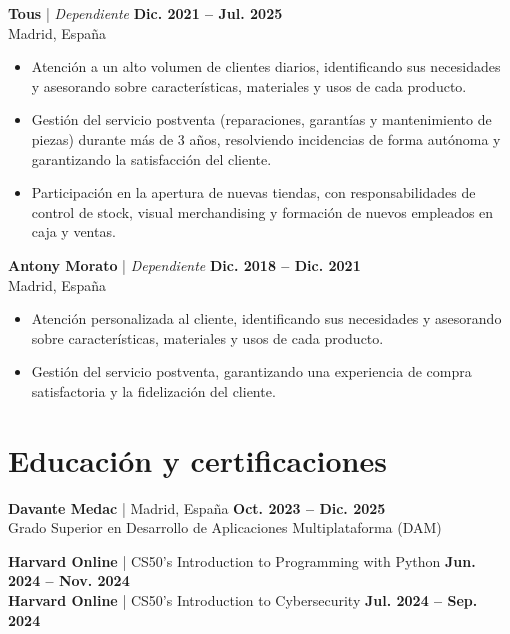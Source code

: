 \documentclass[10pt,a4paper]{article}
\begin{document}
\textbf{Tous} | \textit{Dependiente} \hfill \textbf{Dic. 2021 -- Jul. 2025} \\
Madrid, España
\begin{itemize}
    \item Atención a un alto volumen de clientes diarios, identificando sus necesidades y asesorando sobre características, materiales y usos de cada producto.
    \item Gestión del servicio postventa (reparaciones, garantías y mantenimiento de piezas) durante más de 3 años, resolviendo incidencias de forma autónoma y garantizando la satisfacción del cliente.
    \item Participación en la apertura de nuevas tiendas, con responsabilidades de control de stock, visual merchandising y formación de nuevos empleados en caja y ventas.
\end{itemize}

\vspace{6pt}

\textbf{Antony Morato} | \textit{Dependiente} \hfill \textbf{Dic. 2018 -- Dic. 2021} \\
Madrid, España
\begin{itemize}
    \item Atención personalizada al cliente, identificando sus necesidades y asesorando sobre características, materiales y usos de cada producto.
    \item Gestión del servicio postventa, garantizando una experiencia de compra satisfactoria y la fidelización del cliente.
\end{itemize}

\section{Educación y certificaciones}

\textbf{Davante Medac} | Madrid, España \hfill \textbf{Oct. 2023 -- Dic. 2025} \\
Grado Superior en Desarrollo de Aplicaciones Multiplataforma (DAM)

\vspace{4pt}

\textbf{Harvard Online} | CS50's Introduction to Programming with Python \hfill \textbf{Jun. 2024 -- Nov. 2024} \\
\textbf{Harvard Online} | CS50's Introduction to Cybersecurity \hfill \textbf{Jul. 2024 -- Sep. 2024}
\end{document}
